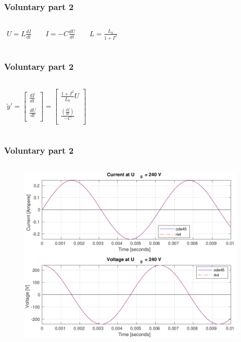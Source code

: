 \documentclass[aspectratio=1610]{beamer}
\begin{document}
\begin{frame}
\frametitle{Voluntary part 2}
	\begin{columns}
		\huge
\begin{align*}
U =L\frac{dI}{dt}\quad\quad
I =-C\frac{dU}{dt}\quad\quad
L = \frac{L_{0}}{1+I^{2}}
\end{align*}
	\end{columns}
\end{frame}
\begin{frame}
\frametitle{Voluntary part 2}
	\begin{columns}
		\column{1\textwidth}
		\Huge
\begin{align*}
\tilde{y}'=
\begin{bmatrix}
\frac{dI}{dt}\\ \\ 
\frac{dU}{dt}\\
\end{bmatrix}
= \begin{bmatrix}
\frac{1+I^{2}}{L_{0}}{U}\\\\
\frac{\left(\frac{dI}{dt}\right)}{-C}\\
\end{bmatrix}
\end{align*}
	\end{columns}
\end{frame}
\begin{frame}
\frametitle{Voluntary part 2}
	\begin{columns}
			\begin{figure}
				\includegraphics[scale=0.27]{figs/voluntary_2_240V.png}
			\end{figure}
	\end{columns}
\end{frame}
\end{document}
